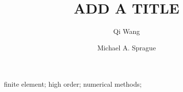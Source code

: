 \documentclass[preprint,12pt]{elsarticle}
\begin{document}
\sloppy

\begin{frontmatter}

\title{ADD A TITLE}

\author[nrel-nwtc]{Qi Wang}

\author[nrel]{Michael A. Sprague}

\address[nrel-nwtc]{National Wind Technology Center,
National Renewable Energy Laboratory, Golden, CO 80401, USA}

\address[nrel]{Computational Science Center,
National Renewable Energy Laboratory, Golden, CO 80401, USA}


\begin{abstract} 

\end{abstract}

\begin{keyword}
finite element;
high order;
numerical methods;
\end{keyword}

\end{frontmatter}



\cite{Brito-Sprague:2012}









\end{document}
